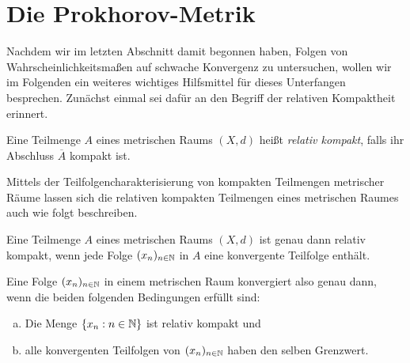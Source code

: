 \section{Die Prokhorov-Metrik}
Nachdem wir im letzten Abschnitt damit begonnen haben, Folgen von Wahrscheinlichkeitsmaßen auf schwache Konvergenz zu untersuchen, wollen wir im Folgenden ein weiteres wichtiges Hilfsmittel für dieses Unterfangen besprechen.
Zunächst einmal sei dafür an den Begriff der relativen Kompaktheit erinnert. 
\begin{mydef}
    Eine Teilmenge $A$ eines metrischen Raums $(X,d)$ heißt \textit{relativ kompakt}, falls ihr Abschluss $\overline{A}$ kompakt ist. 
\end{mydef}
Mittels der Teilfolgencharakterisierung von kompakten Teilmengen metrischer Räume lassen sich die relativen kompakten Teilmengen eines metrischen Raumes auch wie folgt beschreiben.

\begin{proposition}
    Eine Teilmenge $A$ eines metrischen Raums $(X,d)$ ist genau dann relativ kompakt, wenn jede Folge $(x_n)_{n \in \mathbb{N}}$ in $A$ eine konvergente Teilfolge enthält.
\end{proposition}
Eine Folge $(x_n)_{n \in \mathbb{N}}$ in einem metrischen Raum konvergiert also genau dann, wenn die beiden folgenden Bedingungen erfüllt sind:
\begin{enumerate}[(a)]
    \item Die Menge $\{x_n : n \in \mathbb{N} \}$ ist relativ kompakt und
    \item alle konvergenten Teilfolgen von $(x_n)_{n \in \mathbb{N}}$ haben den selben Grenzwert. 
\end{enumerate}

